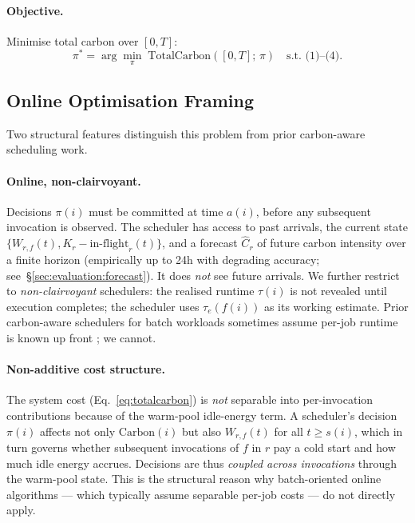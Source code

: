 \paragraph{Objective.} Minimise total carbon over $[0, T]$:
\begin{equation}
\pi^* = \arg\min_{\pi}\;\mathrm{TotalCarbon}([0,T];\,\pi)
\quad \text{s.t. (1)--(4)}.
\label{eq:objective}
\end{equation}

\subsection{Online Optimisation Framing}
\label{sec:problem:online}

Two structural features distinguish this problem from prior
carbon-aware scheduling work.

\paragraph{Online, non-clairvoyant.} Decisions $\pi(i)$ must be
committed at time $a(i)$, before any subsequent invocation is
observed. The scheduler has access to past arrivals, the current state
$\{W_{r,f}(t), K_r - \mathrm{in\text{-}flight}_r(t)\}$, and a forecast
$\hat{C}_r$ of future carbon intensity over a finite horizon
(empirically up to 24h with degrading accuracy;
see~\S\ref{sec:evaluation:forecast}). It does \emph{not} see future
arrivals. We further restrict to \emph{non-clairvoyant} schedulers:
the realised runtime $\tau(i)$ is not revealed until execution
completes; the scheduler uses $\tau_e(f(i))$ as its working estimate.
Prior carbon-aware schedulers for batch workloads sometimes assume
per-job runtime is known up front \citep{hanafy2023carbonscaler}; we
cannot.

\paragraph{Non-additive cost structure.} The system cost
(Eq.~\ref{eq:totalcarbon}) is \emph{not} separable into
per-invocation contributions because of the warm-pool idle-energy
term. A scheduler's decision $\pi(i)$ affects not only
$\mathrm{Carbon}(i)$ but also $W_{r,f}(t)$ for all $t \ge s(i)$,
which in turn governs whether subsequent invocations of $f$ in $r$
pay a cold start and how much idle energy accrues. Decisions are
thus \emph{coupled across invocations} through the warm-pool state.
This is the structural reason why batch-oriented online algorithms
--- which typically assume separable per-job costs --- do not
directly apply.

